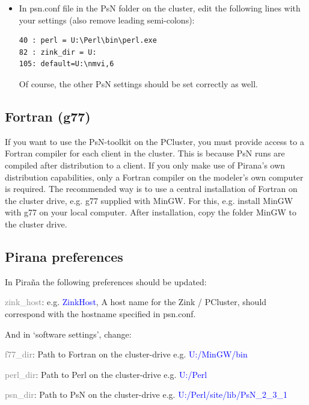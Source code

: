 \documentclass[a4,11pt]{report} \usepackage[pdftex]{graphicx}
\begin{document}
{\begin{itemize}
\item In psn.conf file in the PsN folder on the cluster, edit the
following lines with your settings (also remove leading semi-colons):
\begin{verbatim}
40 : perl = U:\Perl\bin\perl.exe
82 : zink_dir = U:
105: default=U:\nmvi,6
\end{verbatim} Of course, the other PsN settings should be set correctly as well.

\end{itemize}

\subsection*{Fortran (g77)} If you want to use the PsN-toolkit on
the PCluster, you must provide access to a Fortran compiler for each
client in the cluster. This is because PsN runs are compiled after
distribution to a client. If you only make use of Pirana's own
distribution capabilities, only a Fortran compiler on the modeler's
own computer is required. The recommended way is to use a central
installation of Fortran on the cluster drive, e.g. g77 supplied with
MinGW. For this, e.g. install MinGW with g77 on your local
computer. After installation, copy the folder MinGW to the cluster
drive.

\subsection*{Pirana preferences} In Pira\~na the following
preferences should be updated:
\begin{description}
	\item \textcolor{Grey}{zink\_host}:
e.g. \textcolor{Blue}{ZinkHost}, A host name for the Zink / PCluster,
should correspond with the hostname specified in psn.conf.
\end{description}
\noindent And in `software settings', change:
\begin{description}
  \item \textcolor{Grey}{f77\_dir}: Path to Fortran on the
cluster-drive e.g.  \textcolor{Blue}{U:/MinGW/bin}
  \item \textcolor{Grey}{perl\_dir}: Path to Perl on the cluster-drive
e.g.  \textcolor{Blue}{U:/Perl}
  \item \textcolor{Grey}{psn\_dir}: Path to PsN on the cluster-drive
e.g.  \textcolor{Blue}{U:/Perl/site/lib/PsN\_2\_3\_1}
\end{description}

}
\end{document}
